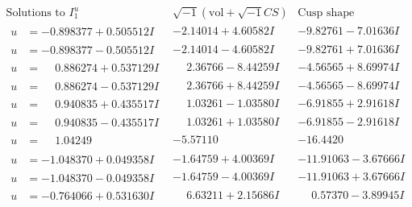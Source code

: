 \documentclass[1p]{elsarticle_modified}
\theoremstyle{definition}
\newcommand{\I}{\sqrt{-1}}
\begin{document}
$$\begin{array}{c|c|c}  
\text{Solutions to }I^u_{1}& \I (\text{vol} + \sqrt{-1}CS) & \text{Cusp shape}\\
 \hline 
\begin{aligned}
u &= -0.898377 + 0.505512 I\end{aligned}
 & -2.14014 + 4.60582 I & -9.82761 - 7.01636 I \\ \hline\begin{aligned}
u &= -0.898377 - 0.505512 I\end{aligned}
 & -2.14014 - 4.60582 I & -9.82761 + 7.01636 I \\ \hline\begin{aligned}
u &= \phantom{-}0.886274 + 0.537129 I\end{aligned}
 & \phantom{-}2.36766 - 8.44259 I & -4.56565 + 8.69974 I \\ \hline\begin{aligned}
u &= \phantom{-}0.886274 - 0.537129 I\end{aligned}
 & \phantom{-}2.36766 + 8.44259 I & -4.56565 - 8.69974 I \\ \hline\begin{aligned}
u &= \phantom{-}0.940835 + 0.435517 I\end{aligned}
 & \phantom{-}1.03261 - 1.03580 I & -6.91855 + 2.91618 I \\ \hline\begin{aligned}
u &= \phantom{-}0.940835 - 0.435517 I\end{aligned}
 & \phantom{-}1.03261 + 1.03580 I & -6.91855 - 2.91618 I \\ \hline\begin{aligned}
u &= \phantom{-}1.04249\phantom{ +0.000000I}\end{aligned}
 & -5.57110\phantom{ +0.000000I} & -16.4420\phantom{ +0.000000I} \\ \hline\begin{aligned}
u &= -1.048370 + 0.049358 I\end{aligned}
 & -1.64759 + 4.00369 I & -11.91063 - 3.67666 I \\ \hline\begin{aligned}
u &= -1.048370 - 0.049358 I\end{aligned}
 & -1.64759 - 4.00369 I & -11.91063 + 3.67666 I \\ \hline\begin{aligned}
u &= -0.764066 + 0.531630 I\end{aligned}
 & \phantom{-}6.63211 + 2.15686 I & \phantom{-}0.57370 - 3.89945 I \\ \hline\begin{aligned}

\end{aligned}
\end{array}$$
\end{document}
